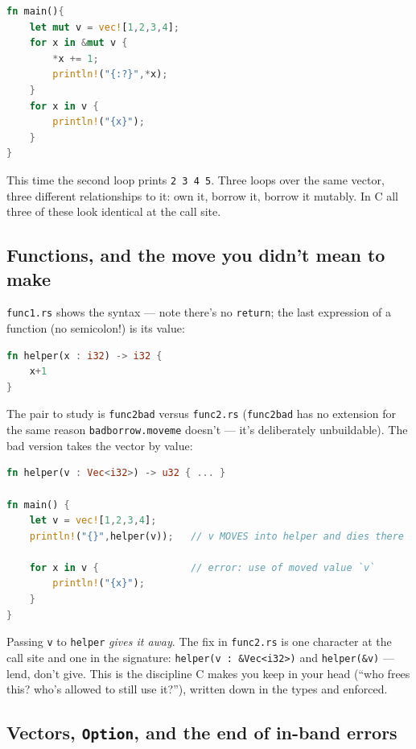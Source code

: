 \documentclass[11pt]{article}
\begin{document}
\begin{lstlisting}[language=Rust]
fn main(){
    let mut v = vec![1,2,3,4];
    for x in &mut v {
        *x += 1;
        println!("{:?}",*x);
    }
    for x in v {
        println!("{x}");
    }
}
\end{lstlisting}

This time the second loop prints \texttt{2 3 4 5}. Three loops over
the same vector, three different relationships to it: own it, borrow
it, borrow it mutably. In C all three of these look identical at the
call site.

\subsection*{Functions, and the move you didn't mean to make}

\texttt{func1.rs} shows the syntax --- note there's no
\texttt{return}; the last expression of a function (no semicolon!) is
its value:

\begin{lstlisting}[language=Rust]
fn helper(x : i32) -> i32 {
    x+1
}
\end{lstlisting}

The pair to study is \texttt{func2bad} versus \texttt{func2.rs}
(\texttt{func2bad} has no extension for the same reason
\texttt{badborrow.moveme} doesn't --- it's deliberately unbuildable).
The bad version takes the vector by value:

\begin{lstlisting}[language=Rust]
fn helper(v : Vec<i32>) -> u32 { ... }

fn main() {
    let v = vec![1,2,3,4];
    println!("{}",helper(v));   // v MOVES into helper and dies there

    for x in v {                // error: use of moved value `v`
        println!("{x}");
    }
}
\end{lstlisting}

Passing \texttt{v} to \texttt{helper} \emph{gives it away}. The fix
in \texttt{func2.rs} is one character at the call site and one in the
signature: \texttt{helper(v : \&Vec<i32>)} and
\texttt{helper(\&v)} --- lend, don't give. This is the discipline C
makes you keep in your head (``who frees this? who's allowed to still
use it?''), written down in the types and enforced.

\subsection*{Vectors, \texttt{Option}, and the end of in-band errors}
\end{document}
